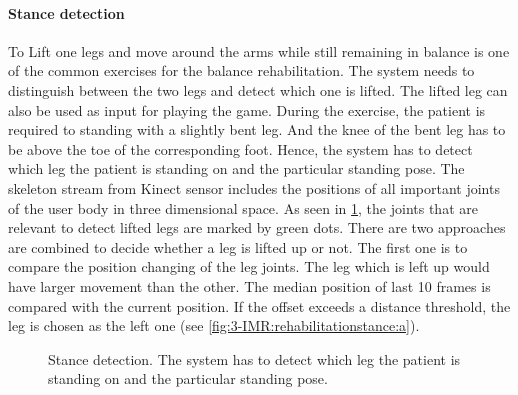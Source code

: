 \paragraph{Stance detection}
To Lift one legs and move around the arms while still remaining in balance is one of the common exercises for the balance rehabilitation. The system needs to distinguish between the two legs and detect which one is lifted. The lifted leg can also be used as input for playing the game. During the exercise, the patient is required to standing with a slightly bent leg. And the knee of the bent leg has to be above the toe of the corresponding foot. Hence, the system has to detect which leg the patient is standing on and the particular standing pose. 
The skeleton stream from Kinect sensor includes the positions of all important joints of the user body in three dimensional space. As seen in \figurename{\ref{fig:3-IMR:rehabilitationstance}}, the joints that are relevant to detect lifted legs are marked by green dots. There are two approaches are combined to decide whether a leg is lifted up or not. The first one is to compare the position changing of the leg joints. The leg which is left up would have larger movement than the other. The median position of last 10 frames is compared with the current position. If the offset exceeds a distance threshold, the leg is chosen as the left one (see \figurename{\ref{fig:3-IMR:rehabilitationstance:a}}).
\begin{figure}
	\centering
	\caption{Stance detection. The system has to detect which leg the patient is standing on and the particular standing pose.}
	\label{fig:3-IMR:rehabilitationstance}
\end{figure}
